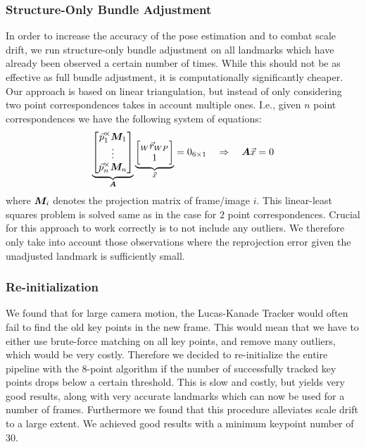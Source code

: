 \documentclass[11pt]{article}
\newcommand{\mat}{\matrixsym}
\begin{document}
\subsubsection{Structure-Only Bundle Adjustment}
In order to increase the accuracy of the pose estimation and to combat scale drift, we run structure-only bundle adjustment on all landmarks which have already been observed a certain number of times. While this should not be as effective as full bundle adjustment, it is computationally significantly cheaper.\\
Our approach is based on linear triangulation, but instead of only considering two point correspondences takes in account multiple ones. I.e., given $n$ point correspondences we have the following system of equations:
\begin{equation*}
\underbrace{\begin{bmatrix} \vec{p}_1^\times \mat{M}_1\\ \vdots \\ \vec{p}_n^\times \mat{M}_n \end{bmatrix}}_{\mat{A}} \underbrace{\begin{bmatrix} {}_W\vec{r}_{WP} \\ 1 \end{bmatrix}}_{\vec{x}} = 0_{6 \times 1} \quad \Rightarrow \quad \mat{A} \vec{x} = 0
\end{equation*}
where $\mat{M}_i$ denotes the projection matrix of frame/image $i$. This linear-least squares problem is solved same as in the case for $2$ point correspondences. Crucial for this approach to work correctly is to not include any outliers. We therefore only take into account those observations where the reprojection error given the unadjusted landmark is sufficiently small. 

\subsubsection{Re-initialization}
We found that for large camera motion, the Lucas-Kanade Tracker would often fail to find the old key points in the new frame. This would mean that we have to either use brute-force matching on all key points, and remove many outliers, which would be very costly. Therefore we decided to re-initialize the entire pipeline with the 8-point algorithm if the number of successfully tracked key points drops below a certain threshold. This is slow and costly, but yields very good results, along with very accurate landmarks which can now be used for a number of frames. Furthermore we found that this procedure alleviates scale drift to a large extent. We achieved good results with a minimum keypoint number of 30. 
\end{document}

